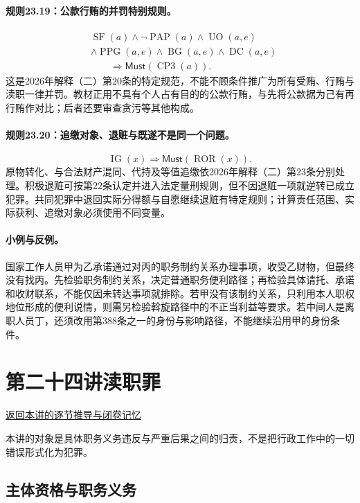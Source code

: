 \paragraph{规则23.19：公款行贿的并罚特别规则。}
\[
\begin{aligned}
&\operatorname{SF}(a)\land\neg\operatorname{PAP}(a)
\land\operatorname{UO}(a,e)\\
&\land\operatorname{PPG}(a,e)
\land\operatorname{BG}(a,e)\land\operatorname{DC}(a,e)\\
&\qquad\Rightarrow\mathsf{Must}(\operatorname{CP3}(a)).
\end{aligned}
\]
这是2026年解释（二）第20条的特定规范，不能不顾条件推广为所有受贿、行贿与渎职一律并罚。教材正用不具有个人占有目的的公款行贿，与先将公款据为己有再行贿作对比；后者还要审查贪污等其他构成。

\paragraph{规则23.20：追缴对象、退赃与既遂不是同一个问题。}
\[
\operatorname{IG}(x)\Rightarrow
\mathsf{Must}(\operatorname{ROR}(x)).
\]
原物转化、与合法财产混同、代持及等值追缴依2026年解释（二）第23条分别处理。积极退赃可按第22条认定并进入法定量刑规则，但不因退赃一项就逆转已成立犯罪。共同犯罪中退回实际分得额与自愿继续退赃有特定规则；计算责任范围、实际获利、追缴对象必须使用不同变量。

\paragraph{小例与反例。}
国家工作人员甲为乙承诺通过对丙的职务制约关系办理事项，收受乙财物，但最终没有找丙。先检验职务制约关系，决定普通职务便利路径；再检验具体请托、承诺和收财联系，不能仅因未转达事项就排除。若甲没有该制约关系，只利用本人职权地位形成的便利说情，则需另检验斡旋路径中的不正当利益等要求。若中间人是离职人员丁，还须改用第388条之一的身份与影响路径，不能继续沿用甲的身份条件。

\section{第二十四讲\quad 渎职罪}

\label{ref:lecture:24}

\noindent\hyperref[lecture:24]{返回本讲的逐节推导与闭卷记忆}

本讲的对象是具体职务义务违反与严重后果之间的归责，不是把行政工作中的一切错误形式化为犯罪。

\subsection{主体资格与职务义务}
